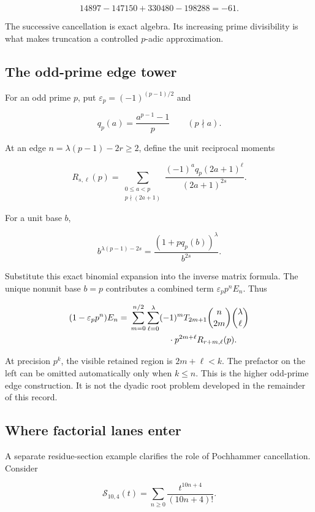 \documentclass[11pt,letterpaper]{article}
\begin{document}
\[
14897-147150+330480-198288=-61.
\]

The successive cancellation is exact algebra. Its increasing prime divisibility is what makes truncation a controlled \(p\)-adic approximation.

\subsection{The odd-prime edge tower}\label{the-odd-prime-edge-tower}

For an odd prime \(p\), put \(\varepsilon_p=(-1)^{(p-1)/2}\) and

\[
q_p(a)=\frac{a^{p-1}-1}{p}\qquad(p\nmid a).
\]

At an edge \(n=\lambda(p-1)-2r\ge2\), define the unit reciprocal moments

\[
R_{s,\ell}(p)=\sum_{\substack{0\le a<p\\p\nmid(2a+1)}}
\frac{(-1)^a q_p(2a+1)^\ell}{(2a+1)^{2s}}.
\]

For a unit base \(b\),

\[
b^{\lambda(p-1)-2s}
=\frac{(1+pq_p(b))^\lambda}{b^{2s}}.
\]

Substitute this exact binomial expansion into the inverse matrix formula. The unique nonunit base \(b=p\) contributes a combined term \(\varepsilon_pp^nE_n\). Thus

\[
\begin{aligned}
(1-\varepsilon_pp^n)E_n
={}&\sum_{m=0}^{n/2}\sum_{\ell=0}^{\lambda}
(-1)^mT_{2m+1}\binom n{2m}\binom\lambda\ell\\
&\hspace{16mm}\cdot p^{2m+\ell}R_{r+m,\ell}(p).
\end{aligned}
\]

At precision \(p^k\), the visible retained region is \(2m+\ell<k\). The prefactor on the left can be omitted automatically only when \(k\le n\). This is the higher odd-prime edge construction. It is not the dyadic root problem developed in the remainder of this record.

\subsection{Where factorial lanes enter}\label{where-factorial-lanes-enter}

A separate residue-section example clarifies the role of Pochhammer cancellation. Consider

\[
\mathcal S_{10,4}(t)=\sum_{n\ge0}\frac{t^{10n+4}}{(10n+4)!}.
\]
\end{document}
